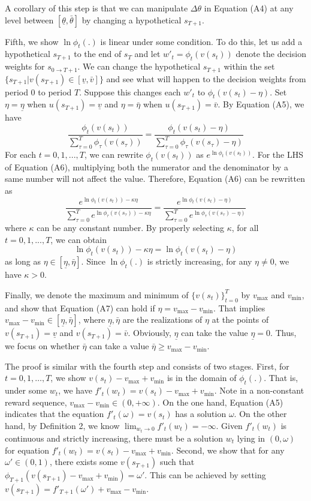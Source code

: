 A corollary of this step is that we can manipulate \(\Delta \theta\) in
Equation (A4) at any level between \([\underline{\theta},\bar{\theta}]\)
by changing a hypothetical \(s_{T+1}\).

Fifth, we show \(\ln \phi_t(.)\) is linear under some condition. To do
this, let us add a hypothetical \(s_{T+1}\) to the end of \(s_T\) and
let \(w'_t=\phi_t(v(s_t))\) denote the decision weights for
\(s_{0\rightarrow T+1}\). We can change the hypothetical \(s_{T+1}\)
within the set \(\{s_{T+1}|v(s_{T+1})\in[\underline{v},\bar{v}]\}\) and
see what will happen to the decision weights from period 0 to period
\(T\). Suppose this changes each \(w'_t\) to \(\phi_t(v(s_t)-\eta)\).
Set \(\eta=\underline{\eta}\) when \(u(s_{T+1})=\underline{v}\) and
\(\eta=\bar{\eta}\) when \(u(s_{T+1})=\bar{v}\). By Equation (A5), we
have\[\tag{A6}
\frac{\phi_t(v(s_t))}{\sum_{\tau=0}^{T}\phi_\tau(v(s_\tau))} = \frac{\phi_t(v(s_t)-\eta)}{\sum_{\tau=0}^{T}\phi_\tau(v(s_\tau)-\eta)}
\]For each \(t=0,1,...,T\), we can rewrite \(\phi_t(v(s_t))\) as
\(e^{\ln \phi_t(v(s_t))}\). For the LHS of Equation (A6), multiplying
both the numerator and the denominator by a same number will not affect
the value. Therefore, Equation (A6) can be rewritten as \[
\frac{e^{\ln\phi_t(v(s_t))-\kappa\eta}}{\sum_{\tau=0}^{T}e^{\ln\phi_\tau(v(s_\tau))-\kappa\eta}} = \frac{e^{\ln\phi_t(v(s_t)-\eta)}}{\sum_{\tau=0}^{T}e^{\ln\phi_\tau(v(s_\tau)-\eta)}}
\]where \(\kappa\) can be any constant number. By properly selecting
\(\kappa\), for all \(t=0,1,...,T\), we can obtain\[\tag{A7}
\ln \phi_t(v(s_t))-\kappa\eta=\ln \phi_t(v(s_t)-\eta)
\]as long as \(\eta \in [\underline{\eta},\bar{\eta}]\). Since
\(\ln\phi_t(.)\) is strictly increasing, for any \(\eta\neq 0\), we have
\(\kappa>0\).

Finally, we denote the maximum and minimum of \(\{v(s_t)\}_{t=0}^T\) by
\(v_{\max}\) and \(v_{\min}\), and show that Equation (A7) can hold if
\(\eta = v_{\max} - v_{\min}\). That implies
\(v_{\max}-v_{\min}\in [\underline{\eta},\bar{\eta}]\), where
\(\underline{\eta}, \bar{\eta}\) are the realizations of \(\eta\) at the
points of \(v(s_{T+1})=\underline{v}\) and \(v(s_{T+1})=\bar{v}\).
Obviously, \(\underline{\eta}\) can take the value
\(\underline{\eta}=0\). Thus, we focus on whether \(\bar{\eta}\) can
take a value \(\bar{\eta}\geq v_{\max}-v_{\min}\).

The proof is similar with the fourth step and consists of two stages.
First, for \(t=0,1,…,T\), we show \(v(s_t)-v_{\max}+v_{\min}\) is in the
domain of \(\phi_t(.)\). That is, under some \(w_t\), we have
\(f'_t(w_t)=v(s_t)-v_{\max}+v_{\min}\). Note in a non-constant reward
sequence, \(v_{\max}-v_{\min}\in(0,+\infty)\). On the one hand, Equation
(A5) indicates that the equation \(f'_t(\omega)=v(s_t)\) has a solution
\(\omega\). On the other hand, by Definition 2, we know
\(\lim_{w_t\rightarrow 0}f'_t(w_t)=-\infty\). Given \(f'_t(w_t)\) is
continuous and strictly increasing, there must be a solution \(w_t\)
lying in \((0,\omega)\) for equation
\(f'_t(w_t)=v(s_t)-v_{\max}+v_{\min}\). Second, we show that for any
\(\omega'\in(0,1)\), there exists some \(v(s_{T+1})\) such that
\(\phi_{T+1}(v(s_{T+1})-v_{\max}+v_{\min})=\omega'\). This can be
achieved by setting \(v(s_{T+1})=f'_{T+1}(\omega')+v_{\max}-v_{\min}\).

